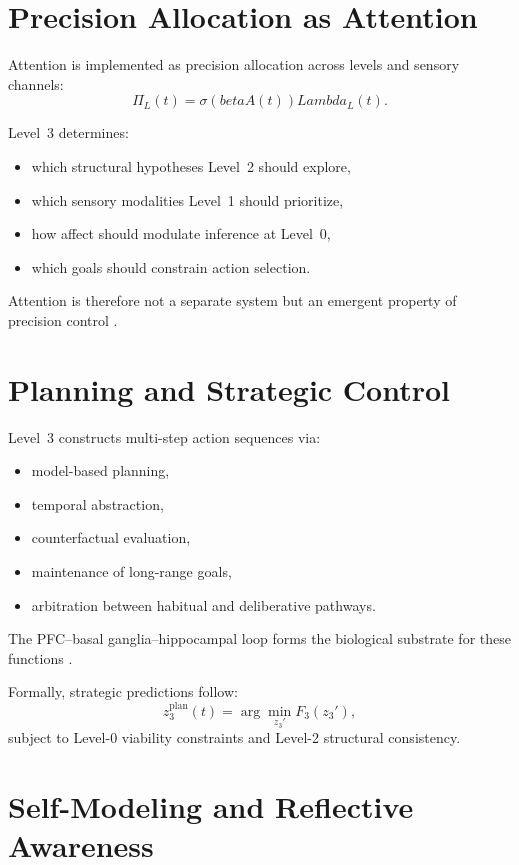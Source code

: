 \documentclass[12pt,oneside]{book}
\theoremstyle{plain}
\theoremstyle{definition}
\let\citep\parencite
\def\beta{beta}%
\def\Lambda{Lambda}%
\begin{document}
\section{Precision Allocation as Attention}

Attention is implemented as precision allocation across levels and sensory
channels:
\[
\Pi_L(t) = \sigma(\beta A(t)) \Lambda_L(t).
\]

Level~3 determines:

\begin{itemize}
  \item which structural hypotheses Level~2 should explore,
  \item which sensory modalities Level~1 should prioritize,
  \item how affect should modulate inference at Level~0,
  \item which goals should constrain action selection.
\end{itemize}

Attention is therefore not a separate system but an emergent property of
precision control \citep{friston2012computational}.

\section{Planning and Strategic Control}

Level~3 constructs multi-step action sequences via:

\begin{itemize}
  \item model-based planning,
  \item temporal abstraction,
  \item counterfactual evaluation,
  \item maintenance of long-range goals,
  \item arbitration between habitual and deliberative pathways.
\end{itemize}

The PFC–basal ganglia–hippocampal loop forms the biological substrate for
these functions \citep{keramati2016speed}.

Formally, strategic predictions follow:
\[
z_3^\text{plan}(t)
= \arg\min_{z_3'} F_3(z_3'),
\]
subject to Level-0 viability constraints and Level-2 structural consistency.

\section{Self-Modeling and Reflective Awareness}
\end{document}

